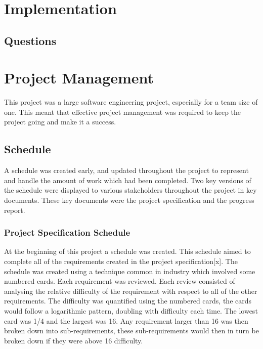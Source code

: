 \documentclass{article}
\begin{document}
\section{Implementation}

\subsection{Questions}



\section{Project Management}

This project was a large software engineering project, especially for a team size of one. This meant that effective project management was required to keep the project going and make it a success. 

\subsection{Schedule}

A schedule was created early, and updated throughout the project to represent and handle the amount of work which had been completed. Two key versions of the schedule were displayed to various stakeholders throughout the project in key documents. These key documents were the project specification and the progress report. 

\subsubsection{Project Specification Schedule}

At the beginning of this project a schedule was created. This schedule aimed to complete all of the requirements created in the project specification[x]. The schedule was created using a technique common in industry which involved some numbered cards. Each requirement was reviewed. Each review consisted of analysing the relative difficulty of the requirement with respect to all of the other requirements. The difficulty was quantified using the numbered cards, the cards would follow a logarithmic pattern, doubling with difficulty each time. The lowest card was 1/4 and the largest was 16. Any requirement larger than 16 was then broken down into sub-requirements, these sub-requirements would then in turn be broken down if they were above 16 difficulty. \\
\end{document}
